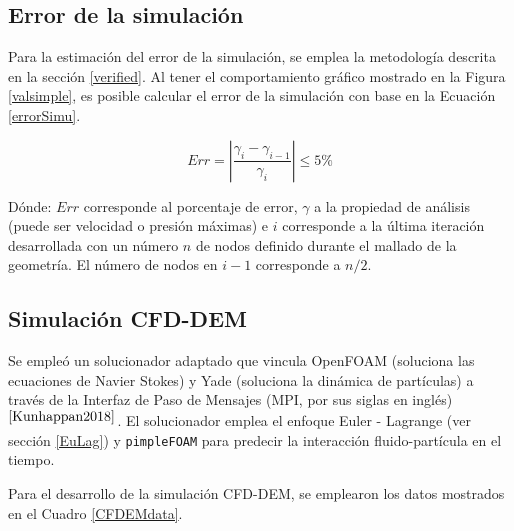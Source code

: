 



\subsection{Error de la simulaci\'on}

\noindent
\justify

Para la estimaci\'on del error de la simulaci\'on, se emplea la metodolog\'ia descrita en la secci\'on \ref{verified}. Al tener el comportamiento gr\'afico mostrado en la Figura \ref{valsimple}, es posible calcular el error de la simulaci\'on con base en la Ecuaci\'on \ref{errorSimu}.

\begin{equation}
	Err = \left| \frac{\gamma _i - \gamma _{i-1}}{\gamma _i} \right| \leq 5 \%
	\label{errorSimu}
\end{equation}

\noindent
\justify

D\'onde: $Err$ corresponde al porcentaje de error, $\gamma$ a la propiedad de an\'alisis (puede ser velocidad o presi\'on m\'aximas) e $i$ corresponde a la \'ultima iteraci\'on desarrollada con un n\'umero $n$ de nodos definido durante el mallado de la geometr\'ia. El n\'umero de nodos en $i-1$ corresponde a $n/2$.

\subsection{Simulaci\'on CFD-DEM}

\noindent
\justify

Se emple\'o un solucionador adaptado que vincula OpenFOAM (soluciona las ecuaciones de Navier Stokes) y Yade (soluciona la din\'amica de part\'iculas) a trav\'es de la Interfaz de Paso de Mensajes (MPI, por sus siglas en ingl\'es)$^{\cite{Kunhappan2018}}$. El solucionador emplea el enfoque Euler - Lagrange (ver secci\'on \ref{EuLag}) y \texttt{pimpleFOAM} para predecir la interacci\'on fluido-part\'icula en el tiempo.

\newpage

\noindent
\justify

Para el desarrollo de la simulaci\'on CFD-DEM, se emplearon los datos mostrados en el Cuadro \ref{CFDEMdata}.

